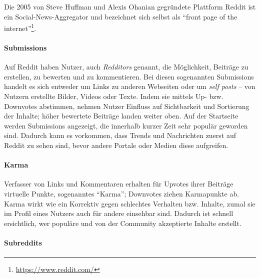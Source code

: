 \documentclass[11pt,a4paper,twoside]{article}
\let\rmarkdownfootnote\footnote%
\def\footnote{\protect\rmarkdownfootnote}
\let\oldpar\paragraph
\renewcommand{\paragraph}{\oldpar*}
\begin{document}
Die 2005 von Steve Huffman und Alexis Ohanian gegründete Plattform
Reddit ist ein Social-News-Aggregator und bezeichnet sich selbst als
\enquote{front page of the internet}\footnote{\url{https://www.reddit.com/}}.

\hypertarget{submissions}{%
\paragraph{Submissions}\label{submissions}}

Auf Reddit haben Nutzer, auch \emph{Redditors} genannt, die Möglichkeit,
Beiträge zu erstellen, zu bewerten und zu kommentieren. Bei diesen
sogenannten Submissions handelt es sich entweder um Links zu anderen
Webseiten oder um \emph{self posts} -- von Nutzern erstellte Bilder,
Videos oder Texte. Indem sie mittels Up- bzw. Downvotes abstimmen,
nehmen Nutzer Einfluss auf Sichtbarkeit und Sortierung der Inhalte;
höher bewertete Beiträge landen weiter oben. Auf der Startseite werden
Submissions angezeigt, die innerhalb kurzer Zeit sehr populär geworden
sind. Dadurch kann es vorkommen, dass Trends und Nachrichten zuerst auf
Reddit zu sehen sind, bevor andere Portale oder Medien diese aufgreifen.

\hypertarget{karma}{%
\paragraph{Karma}\label{karma}}

Verfasser von Links und Kommentaren erhalten für Upvotes ihrer Beiträge
virtuelle Punkte, sogenanntes \enquote{Karma}; Downvotes ziehen
Karmapunkte ab. Karma wirkt wie ein Korrektiv gegen schlechtes Verhalten
bzw. Inhalte, zumal sie im Profil eines Nutzers auch für andere
einsehbar sind. Dadurch ist schnell ersichtlich, wer populäre und von
der Community akzeptierte Inhalte erstellt.

\hypertarget{subreddits}{%
\paragraph{Subreddits}\label{subreddits}}
\end{document}
